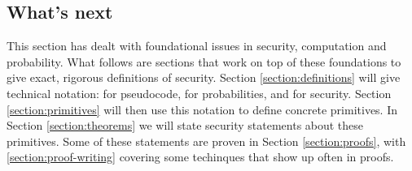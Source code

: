 \subsection*{What's next}

This section has dealt with foundational issues in security, computation and probability. What follows are sections that work on top of these foundations to give exact, rigorous definitions of security. Section \ref{section:definitions} will give technical notation: for pseudocode, for probabilities, and for security. Section \ref{section:primitives} will then use this notation to define concrete primitives. In Section \ref{section:theorems} we will state security statements about these primitives. Some of these statements are proven in Section \ref{section:proofs}, with \ref{section:proof-writing} covering some techinques that show up often in proofs.